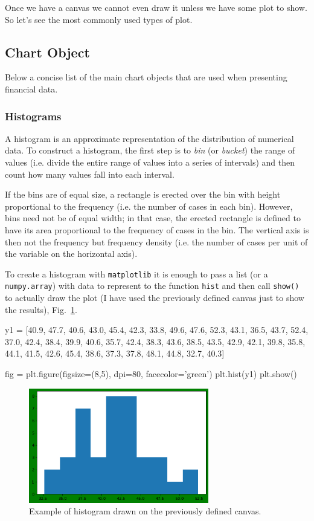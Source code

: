 Once we have a canvas we cannot even draw it unless we have some plot to show. So let's see the most commonly used types of plot.

\subsection{Chart Object}\label{chart-object}

Below a concise list of the main chart objects that are used when presenting financial data.

\subsubsection{Histograms}\label{histograms}

A histogram is an approximate representation of the distribution of numerical data. To construct a histogram, the first step is to \emph{bin} (or \emph{bucket}) the range of values (i.e. divide the entire range of values into a series of intervals) and then count how many values fall into each interval.

If the bins are of equal size, a rectangle is erected over the bin with height proportional to the frequency (i.e. the number of cases in each bin).
However, bins need not be of equal width; in that case, the erected rectangle is defined to have its area proportional to the frequency of cases in the bin. 
The vertical axis is then not the frequency but frequency density (i.e. the number of cases per unit of the variable on the horizontal axis).

To create a histogram with \texttt{matplotlib} it is enough to pass a list (or a \texttt{numpy.array}) with data to represent to the function \texttt{hist} and then call \texttt{show()} to actually draw the plot (I have used the previously defined canvas just to show the results), Fig.~\ref{fig:histo1}.

\begin{ipython}
y1 = [40.9, 47.7, 40.6, 43.0, 45.4, 42.3, 33.8, 49.6,
47.6, 52.3, 43.1, 36.5, 43.7, 52.4, 37.0, 42.4, 38.4, 39.9, 40.6, 35.7, 42.4,
38.3, 43.6, 38.5, 43.5, 42.9, 42.1, 39.8, 35.8, 44.1,
41.5, 42.6, 45.4, 38.6, 37.3, 37.8, 48.1, 44.8, 32.7, 40.3]

fig = plt.figure(figsize=(8,5), dpi=80, facecolor='green')
plt.hist(y1)
plt.show()
\end{ipython}

\begin{figure}[htb]
	\centering
	\includegraphics[width=0.7\textwidth]{figures/histo1}
	\caption{Example of histogram drawn on the previously defined canvas.}
	\label{fig:histo1}
\end{figure}

